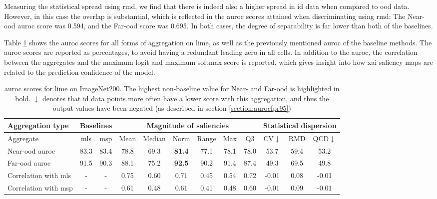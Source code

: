 \documentclass[UKenglish]{uiomasterthesis} %
\theoremstyle{definition}
\begin{document}
Measuring the statistical spread using \ac{rmd}, we find that there is indeed also a higher spread in \ac{id} data when compared to \ac{ood} data. However, in this case the overlap is substantial, which is reflected in the \ac{auroc} scores attained when discriminating using \ac{rmd}: The Near-\ac{ood} \ac{auroc} score was 0.594, and the Far-\ac{ood} score was 0.695. In both cases, the degree of separability is far lower than both of the baselines.

Table \ref{table:imagenet200_lime_metrics} shows the \ac{auroc} scores for all forms of aggregation on \ac{lime}, as well as the previously mentioned \ac{auroc} of the baseline methods. The \ac{auroc} scores are reported as percentages, to avoid having a redundant leading zero in all cells. In addition to the \ac{auroc}, the correlation between the aggregates and the maximum logit and maximum softmax score is reported, which gives insight into how \ac{xai} saliency maps are related to the prediction confidence of the model.

\begin{table}[H]
\setlength\tabcolsep{3pt}
\begin{center}
\begin{tabular}{ |p{5.1em}|c c|c c c c c c|c c c| }
    \hline
     \centering Aggregation type & \multicolumn{2}{c|}{Baselines} & \multicolumn{6}{c|}{Magnitude of saliencies} & \multicolumn{3}{p{8em}|}{\centering Statistical dispersion} \\
    \hline
    Aggregate & \ac{mls} & \ac{msp} & Mean & Median & Norm & Range & Max & Q3 & CV$\downarrow$ & RMD & QCD$\downarrow$  \\
    \hline
    \rowcolor{near!50}
    Near-\ac{ood} \ac{auroc} & 83.3 & 83.4 & 78.8 & 69.3 &\textbf{ 81.4 }& 77.1 & 78.1 & 78.0 & 53.7 & 59.4 & 53.2  \\
    \hline
    \rowcolor{far!50}
    Far-\ac{ood} \ac{auroc} & 91.5 & 90.3 & 88.1 & 75.2 &\textbf{ 92.5 }& 90.2 & 91.4 & 87.4 & 49.3 & 69.5 & 49.8  \\
    \hline
    Correlation with \ac{mls}& - & - & 0.75 & 0.60 & 0.71 & 0.45 & 0.54 & 0.72 & -0.01 & 0.08 & -0.01  \\
    \hline
    Correlation with \ac{msp}& - & - & 0.61 & 0.48 & 0.61 & 0.41 & 0.48 & 0.60 & -0.01 & 0.09 & -0.01  \\
    \hline
    \end{tabular}
    \caption[\ac{auroc} scores for \ac{lime} on ImageNet200]{\ac{auroc} scores for \ac{lime} on ImageNet200. The highest non-baseline value for Near- and Far-\ac{ood} is highlighted in bold. $\downarrow$ denotes that \ac{id} data points more often have a lower score with this aggregation, and thus the output values have been negated (as described in section \ref{section:aurocfpr95})}
    \label{table:imagenet200_lime_metrics}
\end{center}
\setlength\tabcolsep{6pt}
\end{table}
\end{document}
